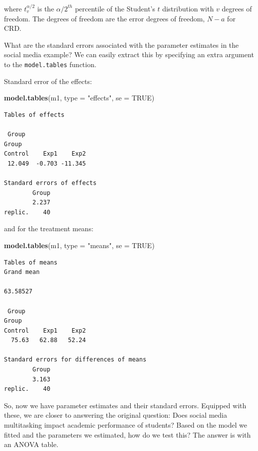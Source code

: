 \documentclass[
  letterpaper,
]{book}
\newenvironment{Shaded}{\begin{snugshade}}{\end{snugshade}}
\newcommand{\AttributeTok}[1]{\textcolor[rgb]{0.13,0.29,0.53}{#1}}
\newcommand{\ConstantTok}[1]{\textcolor[rgb]{0.56,0.35,0.01}{#1}}
\newcommand{\FunctionTok}[1]{\textcolor[rgb]{0.13,0.29,0.53}{\textbf{#1}}}
\newcommand{\NormalTok}[1]{#1}
\newcommand{\StringTok}[1]{\textcolor[rgb]{0.31,0.60,0.02}{#1}}
\begin{document}
where \(t^{\alpha/2}_v\) is the \({\alpha/2}^{th}\) percentile of the
Student's \(t\) distribution with \(v\) degrees of freedom. The degrees
of freedom are the error degrees of freedom, \(N-a\) for CRD.

What are the standard errors associated with the parameter estimates in
the social media example? We can easily extract this by specifying an
extra argument to the \texttt{model.tables} function.

Standard error of the effects:

\begin{Shaded}
\begin{Highlighting}[]
\FunctionTok{model.tables}\NormalTok{(m1, }\AttributeTok{type =} \StringTok{"effects"}\NormalTok{, }\AttributeTok{se =} \ConstantTok{TRUE}\NormalTok{)}
\end{Highlighting}
\end{Shaded}

\begin{verbatim}
Tables of effects

 Group 
Group
Control    Exp1    Exp2 
 12.049  -0.703 -11.345 

Standard errors of effects
        Group
        2.237
replic.    40
\end{verbatim}

and for the treatment means:

\begin{Shaded}
\begin{Highlighting}[]
\FunctionTok{model.tables}\NormalTok{(m1, }\AttributeTok{type =} \StringTok{"means"}\NormalTok{, }\AttributeTok{se =} \ConstantTok{TRUE}\NormalTok{)}
\end{Highlighting}
\end{Shaded}

\begin{verbatim}
Tables of means
Grand mean
         
63.58527 

 Group 
Group
Control    Exp1    Exp2 
  75.63   62.88   52.24 

Standard errors for differences of means
        Group
        3.163
replic.    40
\end{verbatim}

So, now we have parameter estimates and their standard errors. Equipped
with these, we are closer to answering the original question: Does
social media multitasking impact academic performance of students? Based
on the model we fitted and the parameters we estimated, how do we test
this? The answer is with an ANOVA table.
\end{document}
